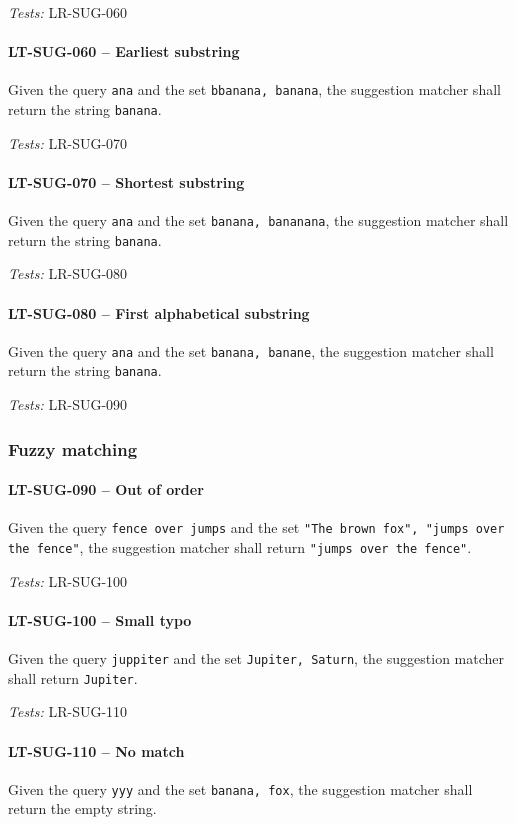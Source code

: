 \textit{Tests: } LR-SUG-060

\paragraph{LT-SUG-060 -- Earliest substring}
Given the query \lstinline{ana} and the set \lstinline{bbanana, banana},
the suggestion matcher shall return the string \lstinline{banana}.

\textit{Tests: } LR-SUG-070

\paragraph{LT-SUG-070 -- Shortest substring}
Given the query \lstinline{ana} and the set \lstinline{banana, bananana},
the suggestion matcher shall return the string \lstinline{banana}.

\textit{Tests: } LR-SUG-080

\paragraph{LT-SUG-080 -- First alphabetical substring}
Given the query \lstinline{ana} and the set \lstinline{banana, banane},
the suggestion matcher shall return the string \lstinline{banana}.

\textit{Tests: } LR-SUG-090

\subsubsection{Fuzzy matching}
\paragraph{LT-SUG-090 -- Out of order}
Given the query \lstinline{fence over jumps} and the set
\lstinline{"The brown fox", "jumps over the fence"}, the suggestion
matcher shall return \lstinline{"jumps over the fence"}.

\textit{Tests: } LR-SUG-100

\paragraph{LT-SUG-100 -- Small typo}
Given the query \lstinline{juppiter} and the set
\lstinline{Jupiter, Saturn}, the suggestion matcher shall return
\lstinline{Jupiter}.

\textit{Tests: } LR-SUG-110

\paragraph{LT-SUG-110 -- No match}
Given the query \lstinline{yyy} and the set
\lstinline{banana, fox}, the suggestion matcher shall return the
empty string.


